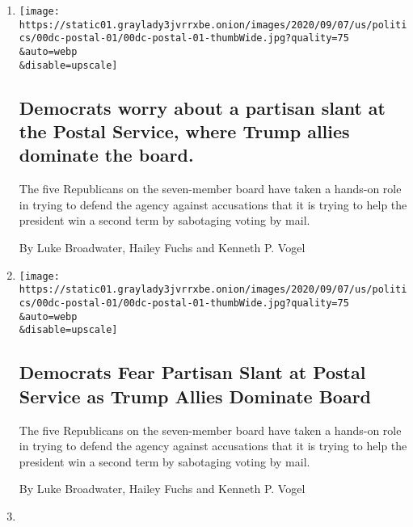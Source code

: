\begin{enumerate}
\def\labelenumi{\arabic{enumi}.}
\item
  \href{/live/2020/09/09/us/trump-vs-biden/democrats-worry-about-a-partisan-slant-at-the-postal-service-where-trump-allies-dominate-the-board}{}

  \texttt{[image: https://static01.graylady3jvrrxbe.onion/images/2020/09/07/us/politics/00dc-postal-01/00dc-postal-01-thumbWide.jpg?quality=75\\\&auto=webp\\\&disable=upscale]}

  \hypertarget{democrats-worry-about-a-partisan-slant-at-the-postal-service-where-trump-allies-dominate-the-board}{%
  \subsection{Democrats worry about a partisan slant at the Postal
  Service, where Trump allies dominate the
  board.}\label{democrats-worry-about-a-partisan-slant-at-the-postal-service-where-trump-allies-dominate-the-board}}

  The five Republicans on the seven-member board have taken a hands-on
  role in trying to defend the agency against accusations that it is
  trying to help the president win a second term by sabotaging voting by
  mail.

  By Luke Broadwater, Hailey Fuchs and Kenneth P. Vogel
\item
  \href{/2020/09/08/us/politics/democrats-postal-service-board-trump.html}{}

  \texttt{[image: https://static01.graylady3jvrrxbe.onion/images/2020/09/07/us/politics/00dc-postal-01/00dc-postal-01-thumbWide.jpg?quality=75\\\&auto=webp\\\&disable=upscale]}

  \hypertarget{democrats-fear-partisan-slant-at-postal-service-as-trump-allies-dominate-board}{%
  \subsection{Democrats Fear Partisan Slant at Postal Service as Trump
  Allies Dominate
  Board}\label{democrats-fear-partisan-slant-at-postal-service-as-trump-allies-dominate-board}}

  The five Republicans on the seven-member board have taken a hands-on
  role in trying to defend the agency against accusations that it is
  trying to help the president win a second term by sabotaging voting by
  mail.

  By Luke Broadwater, Hailey Fuchs and Kenneth P. Vogel
\item
  \href{/live/2020/08/27/us/rnc-convention-election/protesters-gather-in-dc-shortly-before-trumps-speech-to-denounce-the-shooting-of-jacob-blake}{}


\end{enumerate}
